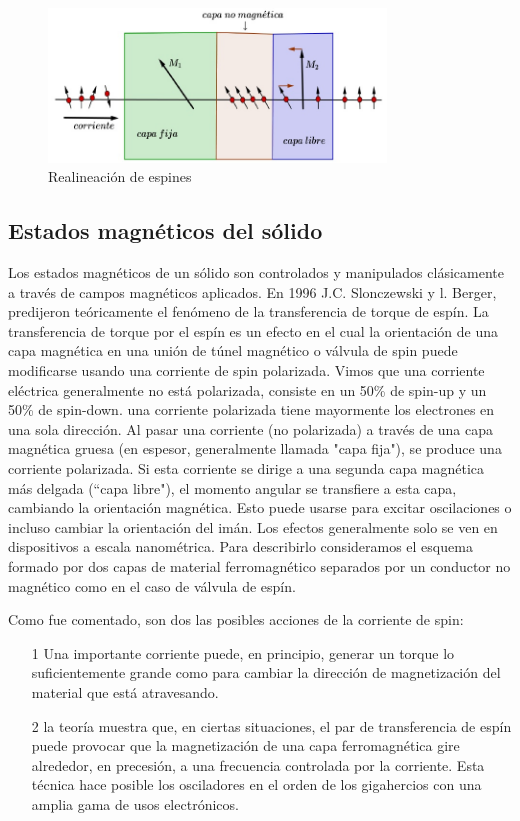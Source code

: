 \begin{figure}[H]
    \centering
    \includegraphics[width=0.8\textwidth]{./Figures/fig350}
	\caption{Realineación de espines}
	\label{fig:350}
\end{figure}


\subsection{Estados magnéticos del sólido}

Los estados magnéticos de un sólido son controlados y manipulados clásicamente a través de campos magnéticos aplicados. En 1996 J.C. Slonczewski y l. Berger, predijeron teóricamente el fenómeno de la transferencia de torque de espín. La transferencia de torque por el espín es un efecto en el cual la orientación de una capa magnética en una unión de túnel magnético o válvula de spin puede modificarse usando una corriente de spin polarizada. Vimos que una corriente eléctrica generalmente no está polarizada, consiste en un 50\% de spin-up y un 50\% de spin-down. una corriente polarizada tiene mayormente los electrones en una sola dirección. Al pasar una corriente (no polarizada) a través de una capa magnética gruesa (en espesor, generalmente llamada "capa fija"), se produce una corriente polarizada. Si esta corriente se dirige a una segunda capa magnética más delgada (“capa libre"), el momento angular se transfiere a esta capa, cambiando la orientación magnética. Esto puede usarse para excitar oscilaciones o incluso cambiar la orientación del imán. Los efectos generalmente solo se ven en dispositivos a escala nanométrica. Para describirlo consideramos el esquema formado por dos capas de material ferromagnético separados por un conductor no magnético como en el caso de válvula de espín.

Como fue comentado, son dos las posibles acciones de la corriente de spin:

\begin{itemize}
	\item[1] Una importante corriente puede, en principio, generar un torque lo suficientemente grande como para cambiar la dirección de magnetización del material que está atravesando.
	
	\item[2] la teoría muestra que, en ciertas situaciones, el par de transferencia de espín puede provocar que la magnetización de una capa ferromagnética gire alrededor, en precesión, a una frecuencia controlada por la corriente. Esta técnica hace posible los osciladores en el orden de los gigahercios con una amplia gama de usos electrónicos.
	
\end{itemize}

